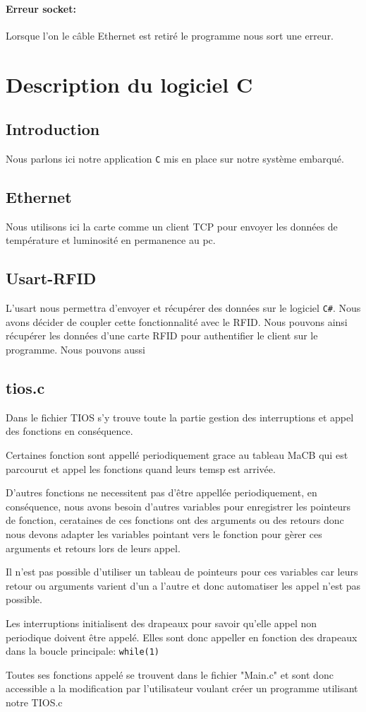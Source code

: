 \documentclass[12pt,a4paper]{report}
\begin{document}
			\paragraph{Erreur socket:} Lorsque l'on le câble Ethernet est retiré le programme nous sort une erreur.
	
	\section{Description du logiciel C} 
		\subsection{Introduction}
		Nous parlons ici notre application \verb+C+ mis en place sur notre système embarqué. 
		\subsection{Ethernet}
		Nous utilisons ici la carte comme un client TCP pour envoyer les données de température et luminosité en permanence au pc. 
		\subsection{Usart-RFID}
		L'usart nous permettra d'envoyer et récupérer des données sur le logiciel \verb+C#+. Nous avons décider de coupler cette fonctionnalité avec le RFID. Nous pouvons ainsi récupérer les données d'une carte RFID pour authentifier le client sur le programme. Nous pouvons aussi 
		\subsection{tios.c}
		Dans le fichier TIOS s'y trouve toute la partie gestion des interruptions et appel des fonctions en conséquence.
 
Certaines fonction sont appellé periodiquement grace au tableau MaCB qui est parcourut et appel les fonctions quand leurs temsp est arrivée.
 
D'autres fonctions ne necessitent pas d'être appellée periodiquement, en conséquence, nous avons besoin d'autres variables pour enregistrer les pointeurs de fonction, cerataines de ces fonctions
ont des arguments ou des retours donc nous devons adapter les variables pointant vers le fonction pour gèrer ces arguments et retours lors de leurs appel.
 
Il n'est pas possible d'utiliser un tableau de pointeurs pour ces variables car leurs retour ou arguments varient d'un a l'autre et donc automatiser les appel n'est pas possible.
 
Les interruptions initialisent des drapeaux pour savoir qu'elle appel non periodique doivent être appelé. Elles sont donc appeller en fonction des drapeaux dans la boucle principale: \verb+while(1)+
	 
Toutes ses fonctions appelé se trouvent dans le fichier "Main.c" et sont donc accessible a la modification par l'utilisateur voulant créer un programme utilisant notre TIOS.c
	
\end{document}
